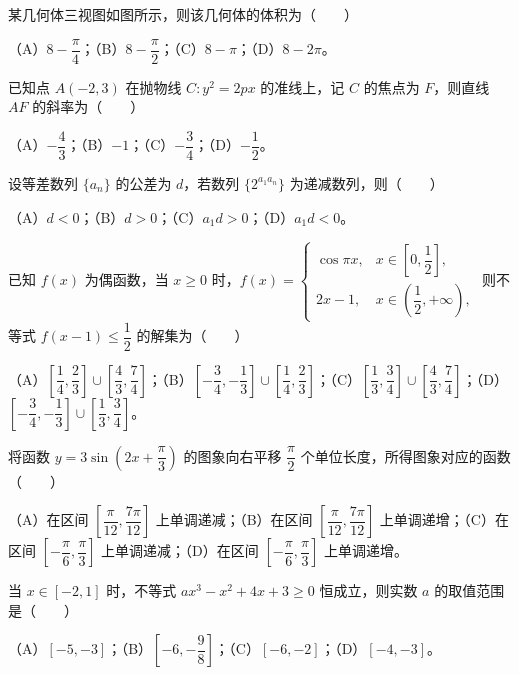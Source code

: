 \begin{question}
某几何体三视图如图所示，则该几何体的体积为\mbox{（　　）}
\nopagebreak[4]
\begin{center}\end{center}
\nopagebreak[4]
（A）$8-\dfrac\pi4$；（B）$8-\dfrac\pi2$；（C）$8-\pi$；（D）$8-2\pi$。

\end{question}
\begin{question}
已知点 $A(-2,3)$ 在抛物线 $C:y^2=2px$ 的准线上，记 $C$ 的焦点为 $F$，则直线 $AF$ 的斜率为\mbox{（　　）}

（A）$-\dfrac43$；（B）$-1$；（C）$-\dfrac34$；（D）$-\dfrac12$。

\end{question}
\begin{question}
设等差数列 $\{a_n\}$ 的公差为 $d$，若数列 $\{2^{a_1a_n}\}$ 为递减数列，则\mbox{（　　）}

（A）$d<0$；（B）$d>0$；（C）$a_1d>0$；（D）$a_1d<0$。

\end{question}
\begin{question}
已知 $f(x)$ 为偶函数，当 $x\geqslant 0$ 时，$f(x)=\begin{cases}\cos\pi x,&x\in\left[0,\dfrac12\right],\\2x-1,&x\in\left(\dfrac12,+\infty\right),\end{cases}$ 则不等式 $f(x-1)\leqslant\dfrac12$ 的解集为\mbox{（　　）}

（A）$\left[\dfrac14,\dfrac23\right]\cup\left[\dfrac43,\dfrac74\right]$；（B）$\left[-\dfrac34,-\dfrac13\right]\cup\left[\dfrac14,\dfrac23\right]$；（C）$\left[\dfrac13,\dfrac34\right]\cup\left[\dfrac43,\dfrac74\right]$；（D）$\left[-\dfrac34,-\dfrac13\right]\cup\left[\dfrac13,\dfrac34\right]$。

\end{question}
\begin{question}
将函数 $y=3\sin\left(2x+\dfrac\pi3\right)$ 的图象向右平移 $\dfrac\pi2$ 个单位长度，所得图象对应的函数\mbox{（　　）}

（A）在区间 $\left[\dfrac\pi{12},\dfrac{7\pi}{12}\right]$ 上单调递减；（B）在区间 $\left[\dfrac\pi{12},\dfrac{7\pi}{12}\right]$ 上单调递增；（C）在区间 $\left[-\dfrac\pi6,\dfrac\pi3\right]$ 上单调递减；（D）在区间 $\left[-\dfrac\pi6,\dfrac\pi3\right]$ 上单调递增。

\end{question}
\begin{question}
当 $x\in[-2,1]$ 时，不等式 $ax^3-x^2+4x+3\geqslant 0$ 恒成立，则实数 $a$ 的取值范围是\mbox{（　　）}

（A）$[-5,-3]$；（B）$\left[-6,-\dfrac98\right]$；（C）$[-6,-2]$；（D）$[-4,-3]$。

\end{question}

